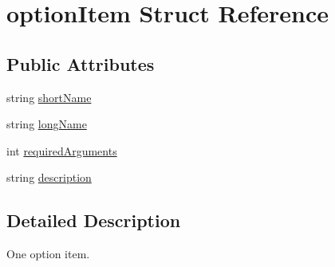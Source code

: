 \hypertarget{structoption_item}{\section{option\-Item Struct Reference}
\label{structoption_item}
}
\subsection*{Public Attributes}
\begin{DoxyCompactItemize}
\item 
string \hyperlink{structoption_item_afc2e09e440800c09721ab7edffe51ff4}{short\-Name}
\item 
string \hyperlink{structoption_item_a296301094a37d51e451046ad95882c3a}{long\-Name}
\item 
int \hyperlink{structoption_item_abaef9292698553f86d1d7270407aef04}{required\-Arguments}
\item 
string \hyperlink{structoption_item_af9012a5d367baa2a2caa0a53dce89a9e}{description}
\end{DoxyCompactItemize}


\subsection{Detailed Description}
One option item. 

